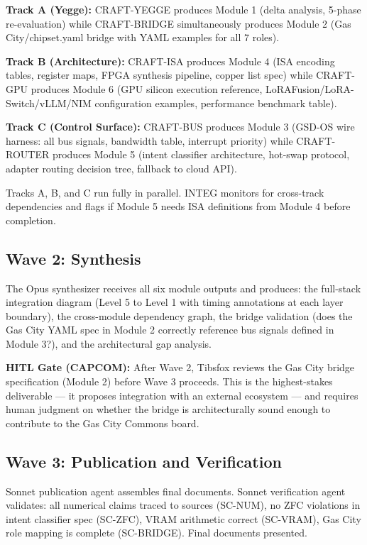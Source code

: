 \documentclass[11pt,letterpaper]{article}
\begin{document}
\textbf{Track A (Yegge):} CRAFT-YEGGE produces Module 1 (delta analysis, 5-phase re-evaluation) while CRAFT-BRIDGE simultaneously produces Module 2 (Gas City/chipset.yaml bridge with YAML examples for all 7 roles).

\textbf{Track B (Architecture):} CRAFT-ISA produces Module 4 (ISA encoding tables, register maps, FPGA synthesis pipeline, copper list spec) while CRAFT-GPU produces Module 6 (GPU silicon execution reference, LoRAFusion/LoRA-Switch/vLLM/NIM configuration examples, performance benchmark table).

\textbf{Track C (Control Surface):} CRAFT-BUS produces Module 3 (GSD-OS wire harness: all bus signals, bandwidth table, interrupt priority) while CRAFT-ROUTER produces Module 5 (intent classifier architecture, hot-swap protocol, adapter routing decision tree, fallback to cloud API).

Tracks A, B, and C run fully in parallel. INTEG monitors for cross-track dependencies and flags if Module 5 needs ISA definitions from Module 4 before completion.

\subsection{Wave 2: Synthesis}

The Opus synthesizer receives all six module outputs and produces: the full-stack integration diagram (Level 5 to Level 1 with timing annotations at each layer boundary), the cross-module dependency graph, the bridge validation (does the Gas City YAML spec in Module 2 correctly reference bus signals defined in Module 3?), and the architectural gap analysis.

\textbf{HITL Gate (CAPCOM):} After Wave 2, Tibsfox reviews the Gas City bridge specification (Module 2) before Wave 3 proceeds. This is the highest-stakes deliverable --- it proposes integration with an external ecosystem --- and requires human judgment on whether the bridge is architecturally sound enough to contribute to the Gas City Commons board.

\subsection{Wave 3: Publication and Verification}

Sonnet publication agent assembles final documents. Sonnet verification agent validates: all numerical claims traced to sources (SC-NUM), no ZFC violations in intent classifier spec (SC-ZFC), VRAM arithmetic correct (SC-VRAM), Gas City role mapping is complete (SC-BRIDGE). Final documents presented.
\end{document}
